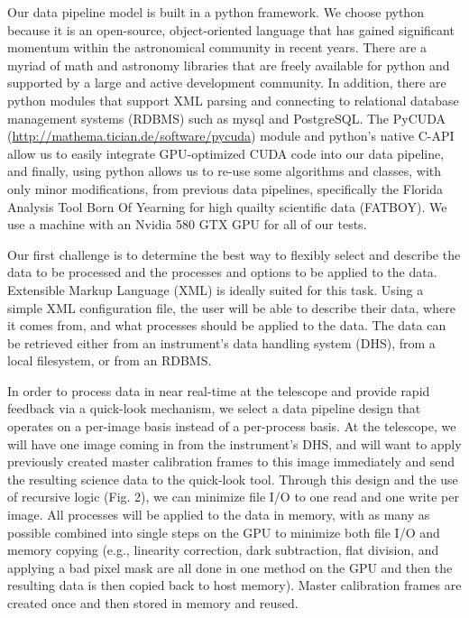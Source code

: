 \documentclass[11pt,twoside]{article}
\begin{document}
Our data pipeline model is built in a python framework.  We choose python
because it is an open-source, object-oriented language that has gained
significant momentum within the astronomical community in recent years.
There are a myriad of math and astronomy libraries that are freely available
for python and supported by a large and active development community.  In
addition, there are python modules that support XML parsing and connecting
to relational database management systems (RDBMS) such as mysql and
PostgreSQL.  The PyCUDA
(\url{http://mathema.tician.de/software/pycuda}) module and python's native
C-API allow us to easily integrate GPU-optimized CUDA code into our data
pipeline, and finally, using python allows us to re-use some algorithms
and classes, with only minor modifications, from previous data pipelines,
specifically the Florida Analysis Tool Born Of Yearning for high quailty
scientific data (FATBOY).  We use a machine with an Nvidia 580 GTX GPU for
all of our tests.

Our first challenge is to determine the best way to flexibly select and
describe the data to be processed and the processes and options to be
applied to the data.  Extensible Markup Language (XML) is ideally suited for
this task.  Using a simple XML configuration file, the user will be able to
describe their data, where it comes from, and what processes should be applied
to the data.  The data can be retrieved either from an instrument's data
handling system (DHS), from a local filesystem, or from an RDBMS.
 
In order to process data in near real-time at the telescope and provide
rapid feedback via a quick-look mechanism, we select a data pipeline design
that operates on a per-image basis instead of a per-process basis.  At the
telescope, we will have one image coming in from the instrument's DHS, 
and will want to apply previously created master calibration frames to this
image immediately and send the resulting science data to the quick-look tool.
Through this design and the use of recursive logic (Fig. 2), we can minimize
file I/O to one read and one write per image.  All processes will be
applied to the data in memory, with as many as possible combined into
single steps on the GPU to minimize both file I/O and memory copying
(e.g., linearity correction, dark subtraction, flat division, and applying
a bad pixel mask are all done in one method on the GPU and then the resulting
data is then copied back to host memory).  Master calibration frames are
created once and then stored in memory and reused.
\end{document}
